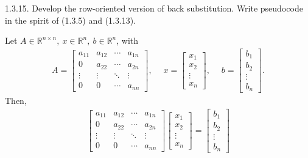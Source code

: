 \documentclass{report}
\begin{document}
    \pagebreak \bigbreak \noindent 
    \begin{mdframed}
        1.3.15. Develop the row-oriented version of back substitution. Write pseudocode in the spirit of (1.3.5) and (1.3.13).
    \end{mdframed}
    \bigbreak \noindent 
                Let $A \in \mathbb{R}^{n\times n},\ x \in \mathbb{R}^{n},\ b \in \mathbb{R}^{n}$, with
            \begin{align*}
                A = \begin{bmatrix}
                    a_{11} & a_{12} & \cdots & a_{1n} \\
                    0 & a_{22} & \cdots & a_{2n} \\
                    \vdots & \vdots & \ddots & \vdots \\
                    0 & 0 & \cdots & a_{nn}
                \end{bmatrix},  \quad \;
                x = \begin{bmatrix}
                    x_{1} \\ x_{2} \\ \vdots \\ x_{n}
                \end{bmatrix}, \quad \;
                b = \begin{bmatrix}
                    b_{1} \\ b_{2} \\ \vdots \\ b_{n}
                \end{bmatrix}
            .\end{align*}
            Then, 
            \begin{align*}
                 \begin{bmatrix}
                    a_{11} & a_{12} & \cdots & a_{1n} \\
                    0 & a_{22} & \cdots & a_{2n} \\
                    \vdots & \vdots & \ddots & \vdots \\
                    0 & 0 & \cdots & a_{nn}
                \end{bmatrix}
                \begin{bmatrix}
                    x_{1} \\ x_{2} \\ \vdots \\ x_{n}
                \end{bmatrix} 
                = \begin{bmatrix}
                    b_{1} \\ b_{2} \\ \vdots \\ b_{n}
                \end{bmatrix}
            \end{align*}
\end{document}
